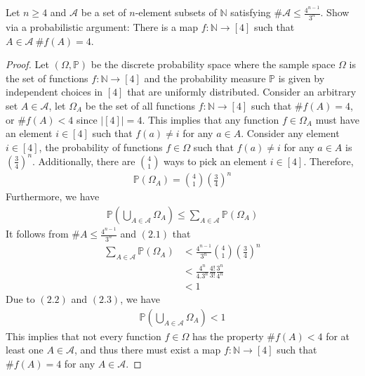 \begin{problem}
Let $n \geq 4$ and $\mathcal{A}$ be a set of $n$-element subsets of $\mathbb{N}$ satisfying $\# \mathcal{A} \leq \frac{4^{n-1}}{3^{n}}$. Show via a probabilistic argument: There is a map $f : \mathbb{N} \rightarrow [4]$ such that $A \in \mathcal{A} \ \# f(A) = 4$.
\end{problem}
\begin{proof}
Let $(\Omega, \mathbb{P})$ be the discrete probability space where the sample space $\Omega$ is the set of functions $f : \mathbb{N} \to [4]$ and the probability measure $\mathbb{P}$ is given by independent choices in $[4]$ that are uniformly distributed. Consider an arbitrary set $A \in \mathcal{A}$, let $\Omega_{A}$ be the set of all functions $f : \mathbb{N} \to [4]$ such that $\# f(A)=4$, or $\# f(A) < 4$ since $|[4]| = 4$. This implies that any function $f \in \Omega_{A}$ must have an element $i \in [4]$ such that $f(a) \neq i$ for any $a \in A$. Consider any element $i \in [4]$, the probability of functions $f \in \Omega$ such that $f(a) \neq i$ for any $a \in A$ is $\left( \frac{3}{4} \right)^{n}$. Additionally, there are $\binom{4}{1}$ ways to pick an element $i \in [4]$. Therefore,
\begin{align*}
\mathbb{P}(\Omega_{A}) = \binom{4}{1} \left( \frac{3}{4} \right)^{n} \tag{2.1}
\end{align*}
Furthermore, we have
\begin{align*}
\mathbb{P}\left( \bigcup_{A \in \mathcal{A}} \Omega_{A} \right) \leq \sum_{A \in \mathcal{A}} \mathbb{P}(\Omega_{A}) \tag{2.2}
\end{align*}
It follows from $\#A \leq  \frac{4^{n-1}}{3^{n}}$ and $(2.1)$ that
\begin{align*}
\sum_{A \in \mathcal{A}} \mathbb{P}(\Omega_{A}) &< \frac{4^{n-1}}{3^{n}} \binom{4}{1} \left( \frac{3}{4} \right)^{n} \\
&< \frac{4^{n}}{4.3^{n}} \frac{4!}{3!} \frac{3^{n}}{4^{n}}\\
&< 1 \tag{2.3}
\end{align*}
Due to $(2.2)$ and $(2.3)$, we have
\begin{align*}
\mathbb{P}\left( \bigcup_{A \in \mathcal{A}} \Omega_{A} \right) < 1
\end{align*}
This implies that not every function $f \in \Omega$ has the property $\# f(A) < 4$ for at least one $A \in \mathcal{A}$, and thus there must exist a map $f : \mathbb{N} \to [4]$ such that $\# f(A)=4$ for any $A \in \mathcal{A}$.
\end{proof}

